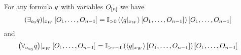 \begin{theorem}
    For any formula $q$ with variables $O_{[n]}$ we have
    \begin{align*}
        {\left(\exists_{o_{0}}q\right)}|_{x_{W}} \left[O_{1},\ldots,O_{n-1}\right] =
        {\mathbb{I}_{>0}}\left(\left\langle {q}|_{x_{W}}\right\rangle \left[ O_{1},\ldots,O_{n-1} \right]\right)\left[O_{1},\ldots,O_{n-1}\right]
    \end{align*}
    and
    \begin{align*}
        {\left(\forall_{a_{o_{0}}} q\right)}|_{x_{W}} \left[O_{1},\ldots,O_{n-1}\right]=
        {\mathbb{I}_{>r-1}}\left(\left\langle {q}|_{x_{W}}\right\rangle \left[ O_{1},\ldots,O_{n-1} \right]\right)\left[O_{1},\ldots,O_{n-1}\right]
    \end{align*}
\end{theorem}
